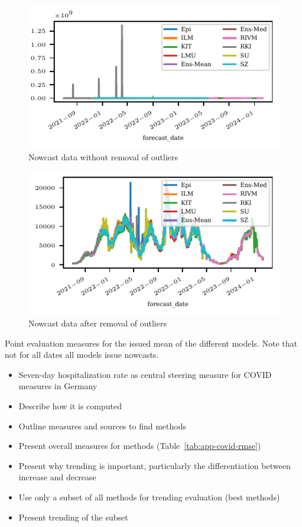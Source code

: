 \begin{figure}
    \centering
    \includegraphics{plots/covid_nowcast/00_nowcast_data.pdf}
    \caption{Nowcast data without removal of outliers}
    \label{fig:app-covid-nowcast}
\end{figure}

\begin{figure}
    \centering
    \includegraphics{plots/covid_nowcast/01_nowcast_data_without_outliers.pdf}
    \caption{Nowcast data after removal of outliers}
    \label{fig:app-covid-nowcast-no-outliers}
\end{figure}

\begin{table}[]
    \centering
    
    \caption{Point evaluation measures for the issued mean of the different models. Note that not for all dates all models issue nowcasts.}
    \label{tab:app-covid-rmse}
\end{table}

\begin{itemize}
    \item Seven-day hospitalization rate as central steering measure for COVID measures in Germany
    \item Describe how it is computed
    \item Outline measures and sources to find methods
    \item Present overall measures for methods (Table~\ref{tab:app-covid-rmse})
    \item Present why trending is important, particularly the differentiation between increase and decrease
    \item Use only a subset of all methods for trending evaluation (best methods)
    \item Present trending of the subset
\end{itemize}


